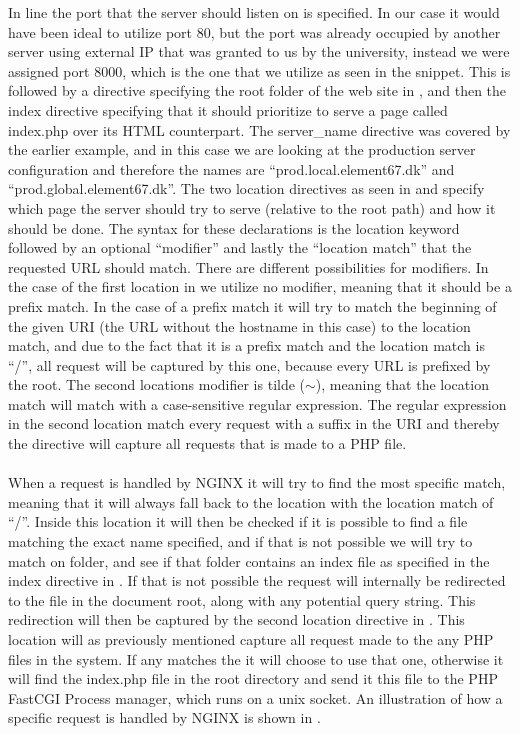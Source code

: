 In line  the port that the server should listen on is specified. In our case it would have been ideal to utilize port 80, but the port was already occupied by another server using external IP that was granted to us by the university, instead we were assigned port 8000, which is the one that we utilize as seen in the snippet. This is followed by a directive specifying the root folder of the web site in , and then the index directive specifying that it should prioritize to serve a page called index.php over its HTML counterpart. The server\_name directive was covered by the earlier example, and in this case we are looking at the production server configuration and therefore the names are ``prod.local.element67.dk'' and ``prod.global.element67.dk''. The two location directives as seen in  and  specify which page the server should try to serve (relative to the root path) and how it should be done. The syntax for these declarations is the location keyword followed by an optional ``modifier'' and lastly the ``location match'' that the requested URL should match. There are different possibilities for modifiers. In the case of the first location in  we utilize no modifier, meaning that it should be a prefix match. In the case of a prefix match it will try to match the beginning of the given URI (the URL without the hostname in this case) to the location match, and due to the fact that it is a prefix match and the location match is ``/'', all request will be captured by this one, because every URL is prefixed by the root. The second locations modifier is tilde ($\sim$), meaning that the location match will match with a case-sensitive regular expression. The regular expression in the second location match every request with a  suffix in the URI and thereby the directive will capture all requests that is made to a PHP file.
\\\\
When a request is handled by NGINX it will try to find the most specific match, meaning that it will always fall back to the location with the location match of ``/''. Inside this location it will then be checked if it is possible to find a file matching the exact name specified, and if that is not possible we will try to match on folder, and see if that folder contains an index file as specified in the index directive in . If that is not possible the request will internally be redirected to the  file in the document root, along with any potential query string. This redirection will then be captured by the second location directive in . This location will as previously mentioned capture all request made to the any PHP files in the system. If any matches the it will choose to use that one, otherwise it will find the index.php file in the root directory and send it this file to the PHP FastCGI Process manager, which runs on a unix socket. An illustration of how a specific request is handled by NGINX is shown in .

